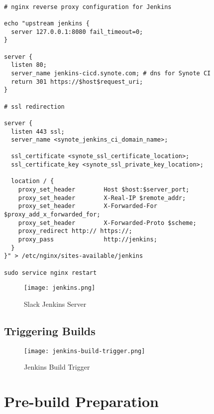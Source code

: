 \begin{listing}[H]
\begin{verbatim}

# nginx reverse proxy configuration for Jenkins

echo "upstream jenkins {
  server 127.0.0.1:8080 fail_timeout=0;
}

server {
  listen 80;
  server_name jenkins-cicd.synote.com; # dns for Synote CI
  return 301 https://$host$request_uri;
}

# ssl redirection

server {
  listen 443 ssl;
  server_name <synote_jenkins_ci_domain_name>;

  ssl_certificate <synote_ssl_certificate_location>;
  ssl_certificate_key <synote_ssl_private_key_location>;

  location / {
    proxy_set_header        Host $host:$server_port;
    proxy_set_header        X-Real-IP $remote_addr;
    proxy_set_header        X-Forwarded-For $proxy_add_x_forwarded_for;
    proxy_set_header        X-Forwarded-Proto $scheme;
    proxy_redirect http:// https://;
    proxy_pass              http://jenkins;
  }
}" > /etc/nginx/sites-available/jenkins

sudo service nginx restart

\end{verbatim}
\label{lst:make-jenkins-available}
\end{listing}

\begin{figure}[!hbt]
  	\centering
 	\texttt{[image: jenkins.png]}
  	\caption{Slack Jenkins Server}
 	\label{fig:synote-jenkins-server}
\end{figure}

\subsection{Triggering Builds}
\label{subsec:triggering-builds}

\begin{figure}[!hbt]
  	\centering
 	\texttt{[image: jenkins-build-trigger.png]}
  	\caption{Jenkins Build Trigger}
 	\label{fig:jenkin-build-trigger}
\end{figure}

\section{Pre-build Preparation}
\label{sec:pre-build-preparation}

